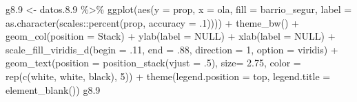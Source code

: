 \documentclass[
  12pt,
]{book}
\newenvironment{Shaded}{\begin{snugshade}}{\end{snugshade}}
\newcommand{\AttributeTok}[1]{\textcolor[rgb]{0.77,0.63,0.00}{#1}}
\newcommand{\ConstantTok}[1]{\textcolor[rgb]{0.00,0.00,0.00}{#1}}
\newcommand{\DecValTok}[1]{\textcolor[rgb]{0.00,0.00,0.81}{#1}}
\newcommand{\FloatTok}[1]{\textcolor[rgb]{0.00,0.00,0.81}{#1}}
\newcommand{\FunctionTok}[1]{\textcolor[rgb]{0.00,0.00,0.00}{#1}}
\newcommand{\NormalTok}[1]{#1}
\newcommand{\OtherTok}[1]{\textcolor[rgb]{0.56,0.35,0.01}{#1}}
\newcommand{\SpecialCharTok}[1]{\textcolor[rgb]{0.00,0.00,0.00}{#1}}
\newcommand{\StringTok}[1]{\textcolor[rgb]{0.31,0.60,0.02}{#1}}
\begin{document}
\begin{Shaded}
\begin{Highlighting}[]
\NormalTok{g8}\FloatTok{.9} \OtherTok{\textless{}{-}}\NormalTok{ datos.}\FloatTok{8.9} \SpecialCharTok{\%\textgreater{}\%} 
  \FunctionTok{ggplot}\NormalTok{(}\FunctionTok{aes}\NormalTok{(}\AttributeTok{y =}\NormalTok{ prop, }\AttributeTok{x =}\NormalTok{ ola, }\AttributeTok{fill =}\NormalTok{ barrio\_segur, }
             \AttributeTok{label =} \FunctionTok{as.character}\NormalTok{(scales}\SpecialCharTok{::}\FunctionTok{percent}\NormalTok{(prop, }\AttributeTok{accuracy =}\NormalTok{ .}\DecValTok{1}\NormalTok{)))) }\SpecialCharTok{+} 
  \FunctionTok{theme\_bw}\NormalTok{() }\SpecialCharTok{+} 
  \FunctionTok{geom\_col}\NormalTok{(}\AttributeTok{position =} \StringTok{\textquotesingle{}Stack\textquotesingle{}}\NormalTok{) }\SpecialCharTok{+}
  \FunctionTok{ylab}\NormalTok{(}\AttributeTok{label =} \ConstantTok{NULL}\NormalTok{) }\SpecialCharTok{+}
  \FunctionTok{xlab}\NormalTok{(}\AttributeTok{label =} \ConstantTok{NULL}\NormalTok{) }\SpecialCharTok{+}
  \FunctionTok{scale\_fill\_viridis\_d}\NormalTok{(}\AttributeTok{begin =}\NormalTok{ .}\DecValTok{11}\NormalTok{, }\AttributeTok{end =}\NormalTok{ .}\DecValTok{88}\NormalTok{, }\AttributeTok{direction =} \DecValTok{1}\NormalTok{, }\AttributeTok{option =} \StringTok{\textquotesingle{}viridis\textquotesingle{}}\NormalTok{) }\SpecialCharTok{+}
  \FunctionTok{geom\_text}\NormalTok{(}\AttributeTok{position =} \FunctionTok{position\_stack}\NormalTok{(}\AttributeTok{vjust =}\NormalTok{ .}\DecValTok{5}\NormalTok{),}
            \AttributeTok{size=} \FloatTok{2.75}\NormalTok{, }\AttributeTok{color =} \FunctionTok{rep}\NormalTok{(}\FunctionTok{c}\NormalTok{(}\StringTok{\textquotesingle{}white\textquotesingle{}}\NormalTok{, }\StringTok{\textquotesingle{}white\textquotesingle{}}\NormalTok{, }\StringTok{\textquotesingle{}black\textquotesingle{}}\NormalTok{), }\DecValTok{5}\NormalTok{)) }\SpecialCharTok{+} 
  \FunctionTok{theme}\NormalTok{(}\AttributeTok{legend.position =} \StringTok{\textquotesingle{}top\textquotesingle{}}\NormalTok{,}
        \AttributeTok{legend.title =} \FunctionTok{element\_blank}\NormalTok{())}
\NormalTok{g8}\FloatTok{.9}
\end{Highlighting}
\end{Shaded}
\end{document}
